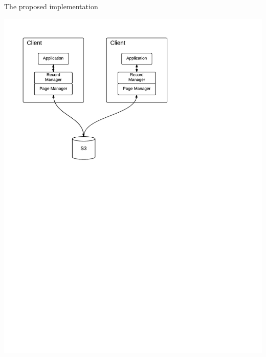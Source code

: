 \documentclass{beamer}
\begin{document}
  \begin{frame}{The proposed implementation}
    \begin{center}
      \includegraphics[width=\linewidth]{img/ADB arch 2.pdf}
    \end{center}
  \end{frame}
\end{document}
